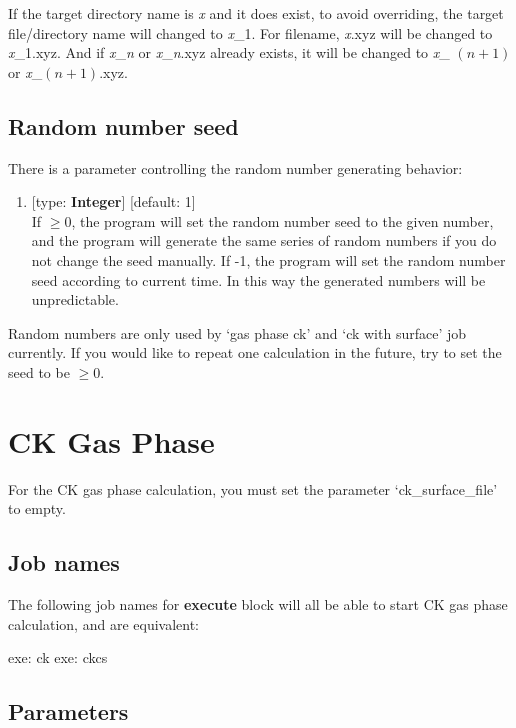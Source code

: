 \documentclass[11pt]{book}
\begin{document}
If the target directory name is \emph{x} and it does exist, to avoid overriding, the target file/directory name will changed to
\emph{x}\_1. For filename, \emph{x}.xyz will be changed to \emph{x}\_1.xyz. And if \emph{x}\_\emph{n} or \emph{x}\_\emph{n}.xyz
already exists, it will be changed to \emph{x}\_ $(n+1)$ or \emph{x}\_$(n+1)$.xyz.

\section{Random number seed}

There is a parameter controlling the random number generating behavior:

\begin{enumerate}
\item {} [type: \textbf{Integer}] [default: 1] \\
	If $\geq 0$, the program will set the random number seed to the given number, and the program will generate the same series of 
	random numbers if you do not change the seed manually. If -1, the program will set the random number seed according to current 
	time. In this way the generated numbers will be unpredictable.
\end{enumerate}

Random numbers are only used by `gas phase ck' and `ck with surface' job currently. If you would like to repeat one calculation in the 
future, try to set the seed to be $\geq 0$.

\chapter{CK Gas Phase}

For the CK gas phase calculation, you must set the parameter `ck\_surface\_file' to empty.

\section{Job names}

The following job names for \textbf{execute} block will all be able to start CK gas phase calculation, and are equivalent:

\begin{everbatim}
{ exe: ck }
{ exe: ckcs }
\end{everbatim}

\section{Parameters} \label{ckp}
\end{document}
